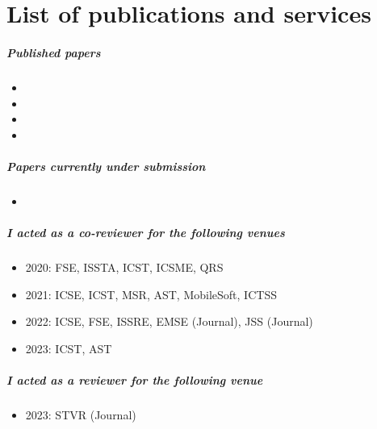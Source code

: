 \chapter*{List of publications and services}

\paragraph{Published papers}

\begin{itemize}
	\item {}
	\item {}
	\item {}
	\item {}
\end{itemize}

\paragraph{Papers currently under submission}

\begin{itemize}
	\item {}
\end{itemize}

\paragraph{I acted as a co-reviewer for the following venues}

\begin{itemize}[label={}]
    \item 2020: FSE, ISSTA, ICST, ICSME, QRS
    \item 2021: ICSE, ICST, MSR, AST, MobileSoft, ICTSS
    \item 2022: ICSE, FSE, ISSRE, EMSE (Journal), JSS (Journal)
    \item 2023: ICST, AST
\end{itemize}

\paragraph{I acted as a reviewer for the following venue}

\begin{itemize}[label={}]
    \item 2023: STVR (Journal)
\end{itemize}


